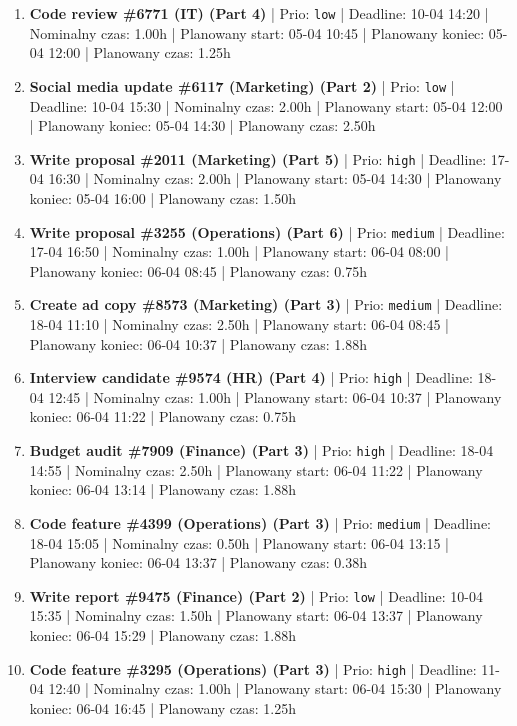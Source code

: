 {\begin{enumerate}
  \item [\textbf{14681}] \textbf{Code review \#6771 (IT) (Part 4)} | Prio: \texttt{low} | Deadline: 10-04 14:20 | Nominalny czas: 1.00h | Planowany start: 05-04 10:45 | Planowany koniec: 05-04 12:00 | Planowany czas: 1.25h
  \item [\textbf{14700}] \textbf{Social media update \#6117 (Marketing) (Part 2)} | Prio: \texttt{low} | Deadline: 10-04 15:30 | Nominalny czas: 2.00h | Planowany start: 05-04 12:00 | Planowany koniec: 05-04 14:30 | Planowany czas: 2.50h
  \item [\textbf{14628}] \textbf{Write proposal \#2011 (Marketing) (Part 5)} | Prio: \texttt{high} | Deadline: 17-04 16:30 | Nominalny czas: 2.00h | Planowany start: 05-04 14:30 | Planowany koniec: 05-04 16:00 | Planowany czas: 1.50h
  \item [\textbf{14654}] \textbf{Write proposal \#3255 (Operations) (Part 6)} | Prio: \texttt{medium} | Deadline: 17-04 16:50 | Nominalny czas: 1.00h | Planowany start: 06-04 08:00 | Planowany koniec: 06-04 08:45 | Planowany czas: 0.75h
  \item [\textbf{14677}] \textbf{Create ad copy \#8573 (Marketing) (Part 3)} | Prio: \texttt{medium} | Deadline: 18-04 11:10 | Nominalny czas: 2.50h | Planowany start: 06-04 08:45 | Planowany koniec: 06-04 10:37 | Planowany czas: 1.88h
  \item [\textbf{14612}] \textbf{Interview candidate \#9574 (HR) (Part 4)} | Prio: \texttt{high} | Deadline: 18-04 12:45 | Nominalny czas: 1.00h | Planowany start: 06-04 10:37 | Planowany koniec: 06-04 11:22 | Planowany czas: 0.75h
  \item [\textbf{14616}] \textbf{Budget audit \#7909 (Finance) (Part 3)} | Prio: \texttt{high} | Deadline: 18-04 14:55 | Nominalny czas: 2.50h | Planowany start: 06-04 11:22 | Planowany koniec: 06-04 13:14 | Planowany czas: 1.88h
  \item [\textbf{14664}] \textbf{Code feature \#4399 (Operations) (Part 3)} | Prio: \texttt{medium} | Deadline: 18-04 15:05 | Nominalny czas: 0.50h | Planowany start: 06-04 13:15 | Planowany koniec: 06-04 13:37 | Planowany czas: 0.38h
  \item [\textbf{14685}] \textbf{Write report \#9475 (Finance) (Part 2)} | Prio: \texttt{low} | Deadline: 10-04 15:35 | Nominalny czas: 1.50h | Planowany start: 06-04 13:37 | Planowany koniec: 06-04 15:29 | Planowany czas: 1.88h
  \item [\textbf{14608}] \textbf{Code feature \#3295 (Operations) (Part 3)} | Prio: \texttt{high} | Deadline: 11-04 12:40 | Nominalny czas: 1.00h | Planowany start: 06-04 15:30 | Planowany koniec: 06-04 16:45 | Planowany czas: 1.25h

\end{enumerate}}
